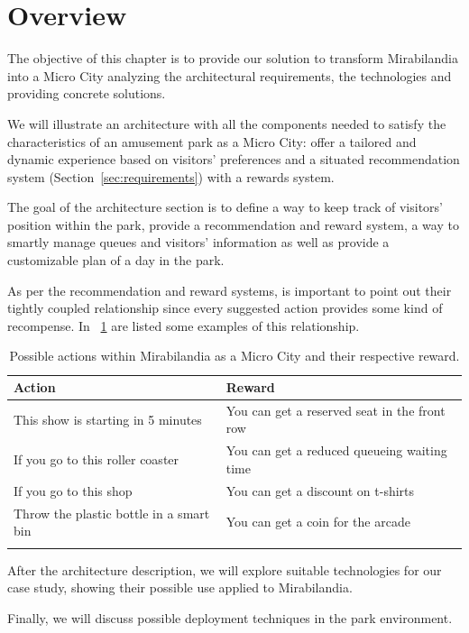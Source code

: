 \section{Overview}\label{sec:overview}
The objective of this chapter is to provide our solution to transform Mirabilandia into a Micro City analyzing the architectural requirements, the technologies and providing concrete solutions.

We will illustrate an architecture with all the components needed to satisfy the characteristics of an amusement park as a Micro City: offer a tailored and dynamic experience based on visitors' preferences and a situated recommendation system (Section~\ref{sec:requirements}) with a rewards system.

The goal of the architecture section is to define a way to keep track of visitors' position within the park, provide a recommendation and reward system, a way to smartly manage queues and visitors' information as well as provide a customizable plan of a day in the park.

As per the recommendation and reward systems, is important to point out their tightly coupled relationship since every suggested action provides some kind of recompense.
In ~\ref{tab:actions-rewards} are listed some examples of this relationship.

\begin{longtable}{|l|l|}
	\hline
	\textbf{Action}                                  & \textbf{Reward}                      \\
	\hline
	This show is starting in 5 minutes  & You can get a reserved seat in the front row \\
	\hline
	If you go to this roller coaster    & You can get a reduced queueing waiting time           \\
	\hline
	If you go to this shop              & You can get a discount on t-shirts           \\
	\hline
	Throw the plastic bottle in a smart bin & You can get a coin for the arcade            \\
	\hline
	\caption{Possible actions within Mirabilandia as a Micro City and their respective reward.}
	\label{tab:actions-rewards}
\end{longtable}

After the architecture description, we will explore suitable technologies for our case study, showing their possible use applied to Mirabilandia.

Finally, we will discuss possible deployment techniques in the park environment. 

